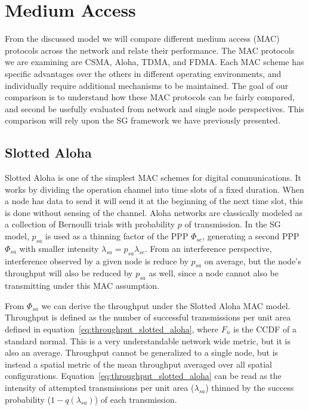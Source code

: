 \section{Medium Access}
%
From the discussed model we will compare different medium access (MAC) protocols across the network and relate their performance.  The MAC protocols we are examining are CSMA, Aloha, TDMA, and FDMA.  Each MAC scheme has specific advantages over the others in different operating environments, and individually require additional mechanisms to be maintained.  The goal of our comparison is to understand how these MAC protocols can be fairly compared, and second be usefully evaluated from network and single node perspectives.  This comparison will rely upon the SG framework we have previously presented.\par
%
\subsection{Slotted Aloha}
%
Slotted Aloha is one of the simplest MAC schemes for digital communications.  It works by dividing the operation channel into time slots of a fixed duration.  When a node has data to send it will send it at the beginning of the next time slot, this is done without sensing of the channel.  Aloha networks are classically modeled as a collection of Bernoulli trials with probability $p$ of transmission.  In the SG model, $p_{sa}$ is used as a thinning factor of the PPP $\Phi_{sc}$, generating a second PPP $\Phi_{sa}$ with smaller intensity $\lambda_{sa} = p_{sa}\lambda_{sc}$.  From an interference perspective, interference observed by a given node is reduce by $p_{sa}$ on average, but the node's throughput will also be reduced by $p_{sa}$ as well, since a node cannot also be transmitting under this MAC assumption.
\par
%
From $\Phi_{sa}$ we can derive the throughput under the Slotted Aloha MAC model.  Throughput is defined as the number of successful transmissions per unit area defined in equation~\eqref{eq:throughput_slotted_aloha}, where $F_n$ is the CCDF of a standard normal.  This is a very understandable network wide metric, but it is also an average.  Throughput cannot be generalized to a single node, but is instead a spatial metric of the mean throughput averaged over all spatial configurations.  Equation~\eqref{eq:throughput_slotted_aloha} can be read as the intensity of attempted transmissions per unit area ($\lambda_{sa}$) thinned by the success probability ($1 - q(\lambda_{sa})$) of each transmission.
